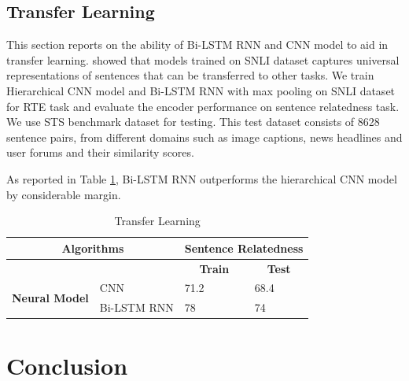 \documentclass[12pt]{report} %
\begin{document}
\section{Transfer Learning}

This section reports on the ability of Bi-LSTM RNN and CNN model to aid in transfer learning. \cite{conneau2017supervised} showed that models trained on SNLI dataset captures universal representations of sentences that can be transferred to other tasks. We train Hierarchical CNN model and Bi-LSTM RNN with max pooling on SNLI dataset for RTE task and evaluate the encoder performance on sentence relatedness task. We use STS benchmark dataset\cite{bibid} for testing.  This test dataset consists of 8628 sentence pairs, from different domains such as image captions, news headlines and user forums and their similarity scores.


As reported in Table \ref{transfer}, Bi-LSTM RNN outperforms the hierarchical CNN model by considerable margin. 

\begin{table}[]
	\centering
	\caption{Transfer Learning}
	\label{transfer}
	\begin{tabular}{|l|l|l|l|}
		\hline
		\multicolumn{2}{|c|}{\textbf{Algorithms}}            & \multicolumn{2}{c|}{\textbf{Sentence Relatedness}}               \\ \hline
		&             & \multicolumn{1}{c|}{\textbf{Train}} & \multicolumn{1}{c|}{\textbf{Test}} \\ \hline
		\multirow{2}{*}{\textbf{Neural Model}} & CNN         & 71.2                                & 68.4                               \\ \cline{2-4} 
		& Bi-LSTM RNN & 78                                  & 74                                 \\ \hline
	\end{tabular}
\end{table}

\chapter{Conclusion}
\end{document}
